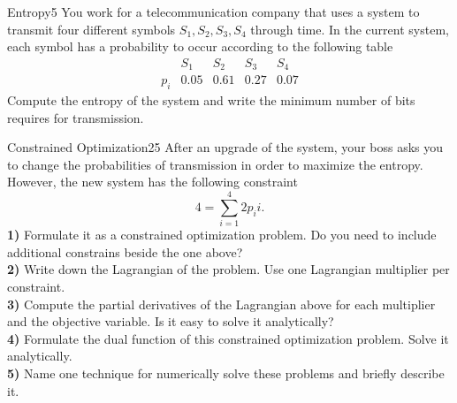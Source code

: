 \newif\ifvimbug
\vimbugfalse

\ifvimbug



\fi

 

\begin{questions}



\begin{question}{Entropy}{5}
You work for a telecommunication company that uses a system to transmit four different symbols ${S_1, S_2, S_3, S_4}$ through time. 
In the current system, each symbol has a probability to occur according to the following table 
\begin{equation*}
\begin{array}{c|c|c|c|c}
 & S_1 & S_2 & S_3 & S_4 \\
\hline
p_i & 0.05    & 0.61    & 0.27    & 0.07
\end{array}
\end{equation*}
Compute the entropy of the system and write the minimum number of bits requires for transmission.

\begin{answer}\end{answer}

\end{question}


\begin{question}{Constrained Optimization}{25}
After an upgrade of the system, your boss asks you to change the probabilities of transmission in order to maximize the entropy. However, the new system has the following constraint
\begin{equation*}
    4 = \sum_{i=1}^4 2p_i i.
\end{equation*}
\textbf{1)} Formulate it as a constrained optimization problem. Do you need to include additional constrains beside the one above?
\\
\textbf{2)} Write down the Lagrangian of the problem. Use one Lagrangian multiplier per constraint.
\\
\textbf{3)} Compute the partial derivatives of the Lagrangian above for each multiplier and the objective variable. Is it easy to solve it analytically? 
\\
\textbf{4)} Formulate the dual function of this constrained optimization problem. Solve it analytically.
\\
\textbf{5)} Name one technique for numerically solve these problems and briefly describe it.


\end{question}
\end{questions}
